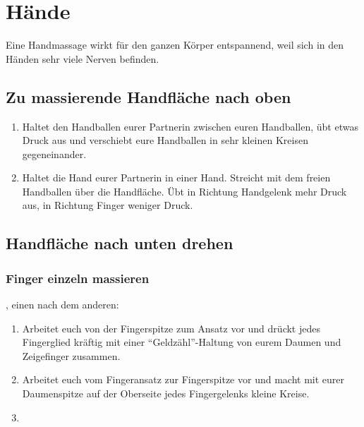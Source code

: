 \section{Hände}

Eine Handmassage wirkt für den ganzen Körper entspannend, weil sich in den Händen sehr viele Nerven befinden.

\subsection{Zu massierende Handfläche nach oben}
\begin{enumerate}
  \item {} Haltet den Handballen eurer Partnerin zwischen euren Handballen, übt etwas Druck aus und verschiebt eure Handballen in sehr kleinen Kreisen gegeneinander.
  \item {} Haltet die Hand eurer Partnerin in einer Hand. Streicht mit dem freien Handballen über die Handfläche. Übt in Richtung Handgelenk mehr Druck aus, in Richtung Finger weniger Druck.
\end{enumerate}


\subsection{Handfläche nach unten drehen}

\subsubsection{Finger einzeln massieren}

\begin{oframed}
  , einen nach dem anderen:
  \begin{enumerate}
    \item {} Arbeitet euch von der Fingerspitze zum Ansatz vor und drückt jedes Fingerglied kräftig mit einer "`Geldzähl"'-Haltung von eurem Daumen und Zeigefinger zusammen.
    \item {} Arbeitet euch vom Fingeransatz zur Fingerspitze vor und macht mit eurer Daumenspitze auf der Oberseite jedes Fingergelenks kleine Kreise.
    \item {}
  \end{enumerate}
\end{oframed}

